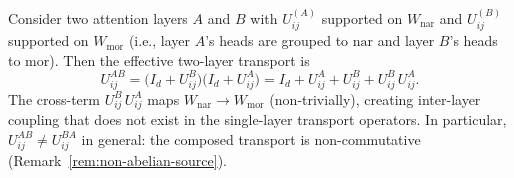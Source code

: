 \begin{proposition}
\label{prop:cross-term}
Consider two attention layers $A$ and $B$ with $U_{ij}^{(A)}$ supported on $W_{\mathrm{nar}}$
and $U_{ij}^{(B)}$ supported on $W_{\mathrm{mor}}$ (i.e., layer $A$'s heads are grouped
to $\mathrm{nar}$ and layer $B$'s heads to $\mathrm{mor}$). Then the effective two-layer
transport is
\[
    U_{ij}^{AB} = \big(I_d + U_{ij}^{B}\big)\big(I_d + U_{ij}^{A}\big)
    = I_d + U_{ij}^{A} + U_{ij}^{B} + U_{ij}^{B}\, U_{ij}^{A}.
\]
The cross-term $U_{ij}^{B}\, U_{ij}^{A}$ maps $W_{\mathrm{nar}} \to W_{\mathrm{mor}}$
(non-trivially), creating inter-layer coupling that does not exist in the single-layer
transport operators. In particular, $U_{ij}^{AB} \neq U_{ij}^{BA}$ in general: the
composed transport is non-commutative (Remark~\ref{rem:non-abelian-source}).
\end{proposition}

